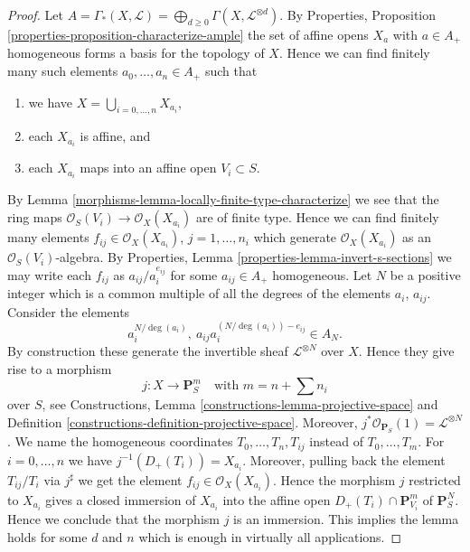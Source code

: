 \begin{proof}

Let
$A = \Gamma_*(X, \mathcal{L}) =
\bigoplus_{d \geq 0} \Gamma(X, \mathcal{L}^{\otimes d})$.
By Properties, Proposition \ref{properties-proposition-characterize-ample}
the set of affine opens $X_a$ with $a \in A_{+}$ homogeneous forms
a basis for the topology of $X$. Hence we can find finitely
many such elements $a_0, \ldots, a_n \in A_{+}$ such that
\begin{enumerate}
\item we have $X = \bigcup_{i = 0, \ldots, n} X_{a_i}$,
\item each $X_{a_i}$ is affine, and
\item each $X_{a_i}$ maps into an affine open $V_i \subset S$.
\end{enumerate}
By Lemma \ref{morphisms-lemma-locally-finite-type-characterize}
we see that the ring maps
$\mathcal{O}_S(V_i) \to \mathcal{O}_X(X_{a_i})$ are
of finite type. Hence we can find finitely many
elements $f_{ij} \in \mathcal{O}_X(X_{a_i})$, $j = 1, \ldots, n_i$
which generate $\mathcal{O}_X(X_{a_i})$ as an $\mathcal{O}_S(V_i)$-algebra.
By Properties, Lemma \ref{properties-lemma-invert-s-sections}
we may write each
$f_{ij}$ as $a_{ij}/a_i^{e_{ij}}$ for some
$a_{ij} \in A_{+}$ homogeneous. Let $N$ be a positive integer which
is a common multiple of all the degrees of the elements
$a_i$, $a_{ij}$. Consider the elements
$$
a_i^{N/\deg(a_i)}, \ a_{ij}a_i^{(N/\deg(a_i)) - e_{ij}} \in A_N.
$$
By construction these generate the invertible sheaf
$\mathcal{L}^{\otimes N}$ over $X$. Hence they give rise
to a morphism
$$
j : X \longrightarrow
\mathbf{P}_S^{m}
\quad
\text{with } m = n + \sum n_i
$$
over $S$, see Constructions, Lemma \ref{constructions-lemma-projective-space}
and Definition \ref{constructions-definition-projective-space}.
Moreover, $j^*\mathcal{O}_{\mathbf{P}_S}(1) = \mathcal{L}^{\otimes N}$.
We name the homogeneous coordinates $T_0, \ldots, T_n, T_{ij}$
instead of $T_0, \ldots, T_m$.
For $i = 0, \ldots, n$ we have $j^{-1}(D_{+}(T_i)) = X_{a_i}$.
Moreover, pulling back the element $T_{ij}/T_i$ via $j^\sharp$ we
get the element $f_{ij} \in \mathcal{O}_X(X_{a_i})$.
Hence the morphism $j$ restricted to $X_{a_i}$
gives a closed immersion of $X_{a_i}$ into the affine open
$D_{+}(T_i) \cap \mathbf{P}^m_{V_i}$ of $\mathbf{P}^N_S$.
Hence we conclude that the morphism $j$ is an immersion.
This implies the lemma holds for some $d$ and $n$ which is enough
in virtually all applications.


\end{proof}
